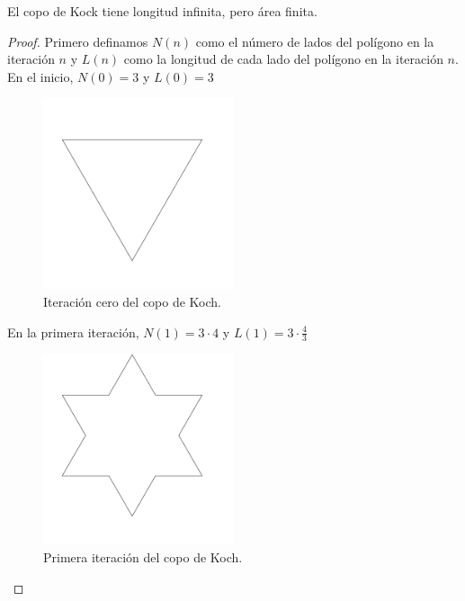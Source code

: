 \begin{theorem}
    El copo de Kock tiene longitud infinita, pero área finita. \cite{youtube-2022}
\end{theorem}

\begin{proof}
    \noindent Primero definamos $N(n)$ como el número de lados del polígono en la iteración $n$ y $L(n)$ como la longitud de cada lado del polígono en la iteración $n$.\\

    \noindent En el inicio, $N(0) = 3$ y $L(0) = 3$\\
    
    \begin{figure}[H]
        \centering
        \includegraphics[width=0.5\textwidth]{figures/koch-snowflake-iteration-0.png}
        \caption{Iteración cero del copo de Koch.}
        \label{fig:koch-snowflake-iteration-0}
    \end{figure}
    
    \noindent En la primera iteración, $N(1) = 3 \cdot 4$ y $L(1) = 3 \cdot \frac{4}{3}$\\
    
    \begin{figure}[H]
        \centering
        \includegraphics[width=0.5\textwidth]{figures/koch-snowflake-iteration-1.png}
        \caption{Primera iteración del copo de Koch.}
        \label{fig:koch-snowflake-iteration-1}
    \end{figure}
    

\end{proof}
